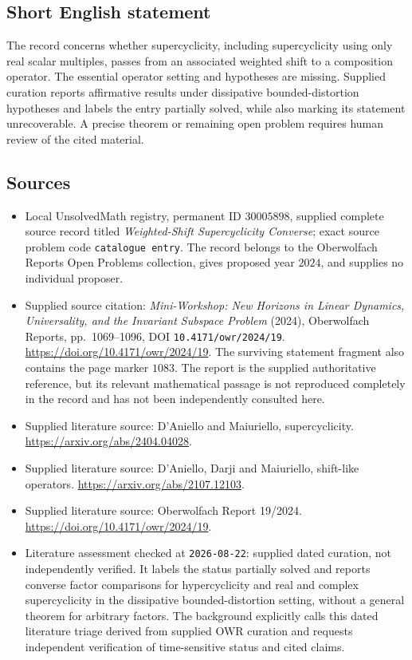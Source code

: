 \documentclass[11pt]{article}
\begin{document}
\subsection{Short English statement}
The record concerns whether supercyclicity, including supercyclicity using only real scalar multiples, passes from an associated weighted shift to a composition operator. The essential operator setting and hypotheses are missing. Supplied curation reports affirmative results under dissipative bounded-distortion hypotheses and labels the entry partially solved, while also marking its statement unrecoverable. A precise theorem or remaining open problem requires human review of the cited material.
\subsection{Sources}
\begin{itemize}
\item Local UnsolvedMath registry, permanent ID \(30005898\), supplied complete source record titled \emph{Weighted-Shift Supercyclicity Converse}; exact source problem code \texttt{catalogue entry}. The record belongs to the Oberwolfach Reports Open Problems collection, gives proposed year \(2024\), and supplies no individual proposer.
\item Supplied source citation: \emph{Mini-Workshop: New Horizons in Linear Dynamics, Universality, and the Invariant Subspace Problem} (2024), Oberwolfach Reports, pp.\ 1069--1096, DOI \texttt{10.4171/owr/2024/19}. \url{https://doi.org/10.4171/owr/2024/19}. The surviving statement fragment also contains the page marker \(1083\). The report is the supplied authoritative reference, but its relevant mathematical passage is not reproduced completely in the record and has not been independently consulted here.
\item Supplied literature source: D'Aniello and Maiuriello, supercyclicity. \url{https://arxiv.org/abs/2404.04028}.
\item Supplied literature source: D'Aniello, Darji and Maiuriello, shift-like operators. \url{https://arxiv.org/abs/2107.12103}.
\item Supplied literature source: Oberwolfach Report 19/2024. \url{https://doi.org/10.4171/owr/2024/19}.
\item Literature assessment checked at \texttt{2026-08-22}: supplied dated curation, not independently verified. It labels the status partially solved and reports converse factor comparisons for hypercyclicity and real and complex supercyclicity in the dissipative bounded-distortion setting, without a general theorem for arbitrary factors. The background explicitly calls this dated literature triage derived from supplied OWR curation and requests independent verification of time-sensitive status and cited claims.
\end{itemize}
\end{document}
